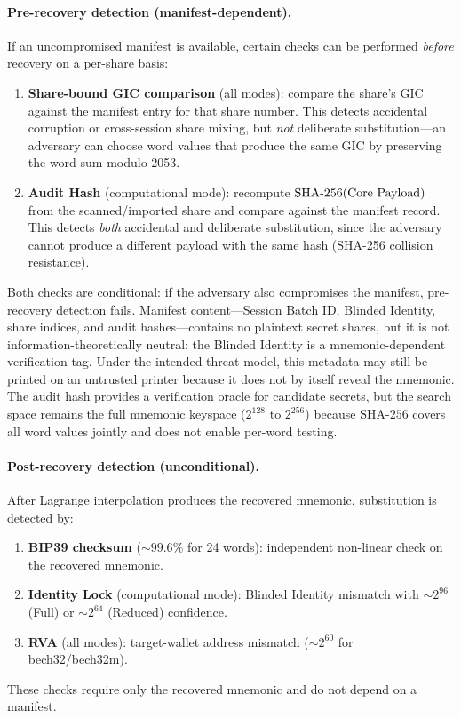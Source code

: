 \documentclass[11pt]{article}
\begin{document}
\paragraph{Pre-recovery detection (manifest-dependent).} If an uncompromised manifest is available, certain checks can be performed \emph{before} recovery on a per-share basis:
\begin{enumerate}[noitemsep]
    \item \textbf{Share-bound GIC comparison} (all modes): compare the share's GIC against the manifest entry for that share number. This detects accidental corruption or cross-session share mixing, but \emph{not} deliberate substitution---an adversary can choose word values that produce the same GIC by preserving the word sum modulo 2053.
    \item \textbf{Audit Hash} (computational mode): recompute $\text{SHA-256}(\text{Core\allowbreak{} Payload})$ from the scanned/\allowbreak{}imported share and compare against the manifest record. This detects \emph{both} accidental and deliberate substitution, since the adversary cannot produce a different payload with the same hash (SHA-256 collision resistance).
\end{enumerate}
Both checks are conditional: if the adversary also compromises the manifest, pre-recovery detection fails. Manifest content---Session Batch ID, Blinded Identity, share indices, and audit hashes---contains no plaintext secret shares, but it is not information-theoretically neutral: the Blinded Identity is a mnemonic-dependent verification tag. Under the intended threat model, this metadata may still be printed on an untrusted printer because it does not by itself reveal the mnemonic. The audit hash provides a verification oracle for candidate secrets, but the search space remains the full mnemonic keyspace ($2^{128}$ to $2^{256}$) because $\text{SHA-256}$ covers all word values jointly and does not enable per-word testing.

\paragraph{Post-recovery detection (unconditional).} After Lagrange interpolation produces the recovered mnemonic, substitution is detected by:
\begin{enumerate}[noitemsep]
    \item \textbf{BIP39 checksum} (${\sim}99.6\%$ for 24 words): independent non-linear check on the recovered mnemonic.
    \item \textbf{Identity Lock} (computational mode): Blinded Identity mismatch with ${\sim}2^{96}$ (Full) or ${\sim}2^{64}$ (Reduced) confidence.
    \item \textbf{RVA} (all modes): target-wallet address mismatch (${\sim}2^{60}$ for bech32/bech32m).
\end{enumerate}
These checks require only the recovered mnemonic and do not depend on a manifest.
\end{document}

